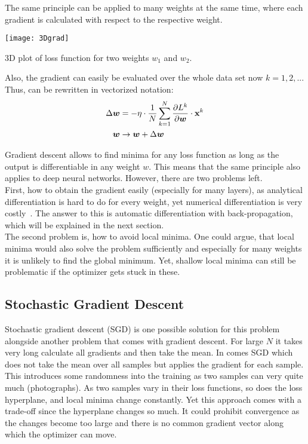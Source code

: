 The same principle can be applied to many weights at the same time, where each gradient is calculated with respect to the respective weight.
\begin{marginfigure}
    \texttt{[image: 3Dgrad]}
    \caption{3D plot of loss function for two  weights $w_1$ and $w_2$.}
\end{marginfigure}
Also, the gradient can easily be evaluated over the whole data set now $k = 1, 2,...$
Thus,  can be rewritten in vectorized notation:
\begin{align}
    \Delta \boldsymbol{w} & = - \eta \cdot \frac{1}{N} \sum_{k=1}^{N} \frac{\partial L^k}{\partial \boldsymbol{w}} \cdot \mathbf{x}^k \\
    \boldsymbol{w} & \rightarrow \boldsymbol{w} + \Delta \boldsymbol{w}
\end{align}

Gradient descent allows to find minima for any loss function as long as the output is differentiable in any weight $w$.
This means that the same principle also applies to deep neural networks.
However, there are two problems left.\\
First, how to obtain the gradient easily (especially for many layers), as analytical differentiation is hard to do for every weight, yet numerical differentiation is very costly~\cite{ommer}.
The answer to this is automatic differentiation with back-propagation, which will be explained in the next section.\\
The second problem is, how to avoid local minima.
One could argue, that local minima would also solve the problem sufficiently and especially for many weights it is unlikely to find the global minimum.
Yet, shallow local minima can still be problematic if the optimizer gets stuck in these.

\subsection{Stochastic Gradient Descent}
Stochastic gradient descent (SGD) is one possible solution for this problem alongside another problem that comes with gradient descent.
For large $N$ it takes very long calculate all gradients and then take the mean.
In comes SGD which does not take the mean over all samples but applies the gradient for each sample.\\
This introduces some randomness into the training as two samples can very quite much (\eg photographs).
As two samples vary in their loss functions, so does the loss hyperplane, and local minima change constantly.
Yet this approach comes with a trade-off since the hyperplane changes so much.
It could prohibit convergence as the changes become too large and there is no common gradient vector along which the optimizer can move.

